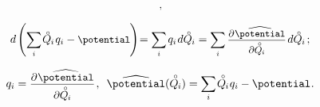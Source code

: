\begin{otherlanguage}{russian}
\begin{equation*}
\begin{array}{c}
\hspace{.2ex} ,
\\[1em]
%
\small
d \hspace{-0.1ex} \left( \scalebox{0.95}[1]{$\displaystyle \sum_{\smash{i}}$} \hspace{.2ex} \mathcircabove{Q}_{\hspace{-0.1ex}i} \hspace{.2ex} q_i - \potential \hspace{-0.1ex} \right) \hspace{-0.5ex}
= \scalebox{0.95}[1]{$\displaystyle \sum_{\smash{i}}$} \hspace{.32ex} q_i \hspace{.2ex} d\mathcircabove{Q}_{\hspace{-0.1ex}i}
= \scalebox{0.95}[1]{$\displaystyle \sum_{\smash{i}}$} \hspace{.4ex}
\scalebox{0.96}{$ \displaystyle \frac{\raisemath{-0.12em}{\partial \hspace{.1ex} \widehat{\potential}}}{\raisemath{-0.4em}{\partial \mathcircabove{Q}_{\hspace{-0.1ex}i}}} $}
\hspace{.25ex} d\mathcircabove{Q}_{\hspace{-0.1ex}i}
%
\hspace{.33ex} ;
\end{array}\end{equation*}%

\nopagebreak\vspace{-0.33em}\begin{equation}\label{Castigliano:theorem}
q_i = \scalebox{0.96}{$ \displaystyle \frac{\raisemath{-0.12em}{\partial \hspace{.1ex} \widehat{\potential}}}{\raisemath{-0.4em}{\partial \mathcircabove{Q}_{\hspace{-0.1ex}i}}} $} \hspace{.2ex} ,
\:\;
\widehat{\potential}(\mathcircabove{Q}_{\hspace{-0.1ex}i})
= \scalebox{0.95}[1]{$\displaystyle \sum_{\smash{i}}$} \hspace{.2ex} \mathcircabove{Q}_{\hspace{-0.1ex}i} \hspace{.12ex} q_i - \potential
\hspace{.1ex} .
\end{equation}


\end{otherlanguage}
